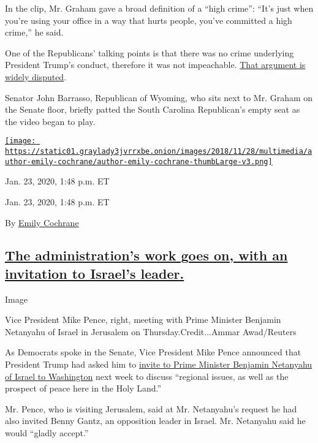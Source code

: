In the clip, Mr. Graham gave a broad definition of a ``high crime'':
``It's just when you're using your office in a way that hurts people,
you've committed a high crime,'' he said.

One of the Republicans' talking points is that there was no crime
underlying President Trump's conduct, therefore it was not impeachable.
\href{https://www.nytimes3xbfgragh.onion/2020/01/20/us/politics/trump-impeachment-legal-defense.html}{That
argument is widely disputed}.

Senator John Barrasso, Republican of Wyoming, who sits next to Mr.
Graham on the Senate floor, briefly patted the South Carolina
Republican's empty seat as the video began to play.

\href{https://www.nytimes3xbfgragh.onion/by/emily-cochrane}{\texttt{[image: https://static01.graylady3jvrrxbe.onion/images/2018/11/28/multimedia/author-emily-cochrane/author-emily-cochrane-thumbLarge-v3.png]}}

Jan. 23, 2020, 1:48 p.m. ET

Jan. 23, 2020, 1:48 p.m. ET

By \href{https://www.nytimes3xbfgragh.onion/by/emily-cochrane}{Emily
Cochrane}

\hypertarget{the-administrations-work-goes-on-with-an-invitation-to-israels-leader}{%
\subsection{\texorpdfstring{\protect\hyperlink{the-administrations-work-goes-on-with-an-invitation-to-israels-leader}{The
administration's work goes on, with an invitation to Israel's
leader.}}{The administration's work goes on, with an invitation to Israel's leader.}}\label{the-administrations-work-goes-on-with-an-invitation-to-israels-leader}}

Image

Vice President Mike Pence, right, meeting with Prime Minister Benjamin
Netanyahu of Israel in Jerusalem on Thursday.Credit...Ammar Awad/Reuters

As Democrats spoke in the Senate, Vice President Mike Pence announced
that President Trump had asked him to
\href{https://www.nytimes3xbfgragh.onion/2020/01/23/world/middleeast/israel-peaceplan-kushner.html}{invite
to Prime Minister Benjamin Netanyahu of Israel to Washington} next week
to discuss ``regional issues, as well as the prospect of peace here in
the Holy Land.''

Mr. Pence, who is visiting Jerusalem, said at Mr. Netanyahu's request he
had also invited Benny Gantz, an opposition leader in Israel. Mr.
Netanyahu said he would ``gladly accept.''

